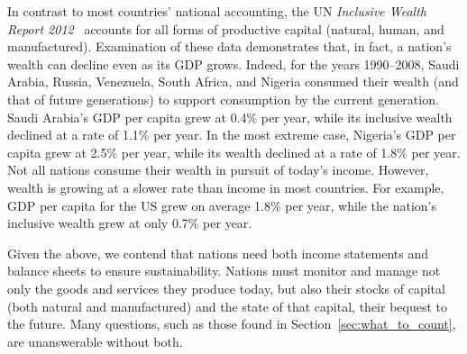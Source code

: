In contrast to most countries' national accounting, 
the UN \emph{Inclusive Wealth Report 2012}~\cite{IWR2012} 
accounts for all forms of productive capital 
(natural, human, and manufactured). 
Examination of these data demonstrates that, in fact, 
a nation's wealth can decline even as its GDP grows. 
Indeed, for the years 1990--2008, Saudi Arabia, Russia, Venezuela, South Africa, and Nigeria 
consumed their wealth (and that of future generations) 
to support consumption by the current generation.
Saudi Arabia's GDP per capita grew at 0.4\% per year, 
while its inclusive wealth declined at a rate of 1.1\% per year. 
In the most extreme case, Nigeria's GDP per capita grew at 2.5\% per year, 
while its wealth declined at a rate of 1.8\% per year.
Not all nations consume their wealth in pursuit of today's income. 
However, wealth is growing at a slower rate than income
in most countries.
For example, GDP per capita for the US grew on average 1.8\% per year, 
while the nation's inclusive wealth grew at only 0.7\% per year.\cite[p.~44]{IWR2012}

Given the above, we contend that nations need both 
income statements and
balance sheets
to ensure sustainability. 
Nations must monitor and manage not only the goods and services they produce today, 
but also their stocks of capital (both natural and manufactured)
and the state of that capital, their bequest to the future. 
Many questions, such as those found in Section~\ref{sec:what_to_count},
are unanswerable without both.

\vspace{10 mm}

